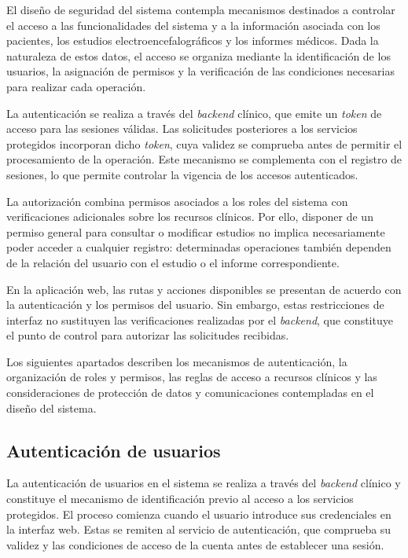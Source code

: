 El diseño de seguridad del sistema contempla mecanismos destinados a controlar el acceso a las funcionalidades del sistema y a la información asociada con los pacientes, los estudios electroencefalográficos y los informes médicos. Dada la naturaleza de estos datos, el acceso se organiza mediante la identificación de los usuarios, la asignación de permisos y la verificación de las condiciones necesarias para realizar cada operación.

La autenticación se realiza a través del \textit{backend} clínico, que emite un \textit{token} de acceso para las sesiones válidas. Las solicitudes posteriores a los servicios protegidos incorporan dicho \textit{token}, cuya validez se comprueba antes de permitir el procesamiento de la operación. Este mecanismo se complementa con el registro de sesiones, lo que permite controlar la vigencia de los accesos autenticados.

La autorización combina permisos asociados a los roles del sistema con verificaciones adicionales sobre los recursos clínicos. Por ello, disponer de un permiso general para consultar o modificar estudios no implica necesariamente poder acceder a cualquier registro: determinadas operaciones también dependen de la relación del usuario con el estudio o el informe correspondiente.

En la aplicación web, las rutas y acciones disponibles se presentan de acuerdo con la autenticación y los permisos del usuario. Sin embargo, estas restricciones de interfaz no sustituyen las verificaciones realizadas por el \textit{backend}, que constituye el punto de control para autorizar las solicitudes recibidas.

Los siguientes apartados describen los mecanismos de autenticación, la organización de roles y permisos, las reglas de acceso a recursos clínicos y las consideraciones de protección de datos y comunicaciones contempladas en el diseño del sistema.


\subsection{Autenticación de usuarios}
\label{subsec:autenticacion-usuarios}

La autenticación de usuarios en el sistema se realiza a través del \textit{backend} clínico y constituye el mecanismo de identificación previo al acceso a los servicios protegidos. El proceso comienza cuando el usuario introduce sus credenciales en la interfaz web. Estas se remiten al servicio de autenticación, que comprueba su validez y las condiciones de acceso de la cuenta antes de establecer una sesión.

